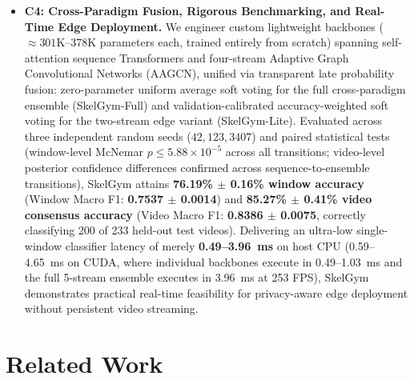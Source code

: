 \documentclass[preprint,12pt]{elsarticle}
\begin{document}
\begin{itemize}
    \item \textbf{C4: Cross-Paradigm Fusion, Rigorous Benchmarking, and Real-Time Edge Deployment.} We engineer custom lightweight backbones ($\approx 301\text{K}$--$378\text{K}$ parameters each, trained entirely from scratch) spanning self-attention sequence Transformers and four-stream Adaptive Graph Convolutional Networks (AAGCN), unified via transparent late probability fusion: zero-parameter uniform average soft voting for the full cross-paradigm ensemble (SkelGym-Full) and validation-calibrated accuracy-weighted soft voting for the two-stream edge variant (SkelGym-Lite). Evaluated across three independent random seeds ($42, 123, 3407$) and paired statistical tests (window-level McNemar $p \le 5.88 \times 10^{-5}$ across all transitions; video-level posterior confidence differences confirmed across sequence-to-ensemble transitions), SkelGym attains \textbf{76.19\% $\pm$ 0.16\% window accuracy} (Window Macro F1: \textbf{0.7537 $\pm$ 0.0014}) and \textbf{85.27\% $\pm$ 0.41\% video consensus accuracy} (Video Macro F1: \textbf{0.8386 $\pm$ 0.0075}, correctly classifying 200 of 233 held-out test videos). Delivering an ultra-low single-window classifier latency of merely \textbf{0.49--3.96~ms} on host CPU (0.59--4.65~ms on CUDA, where individual backbones execute in 0.49--1.03~ms and the full 5-stream ensemble executes in 3.96~ms at 253 FPS), SkelGym demonstrates practical real-time feasibility for privacy-aware edge deployment without persistent video streaming.
\end{itemize}

\section{Related Work}
\end{document}
